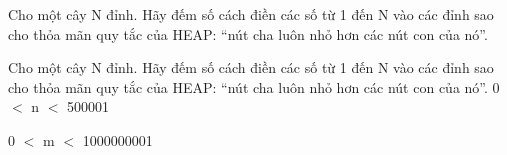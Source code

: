 Cho một cây N đỉnh. Hãy đếm số cách điền các số từ 1 đến N vào các đỉnh sao cho thỏa mãn quy tắc của HEAP: “nút cha luôn nhỏ hơn các nút con của nó”.

Cho một cây N đỉnh. Hãy đếm số cách điền các số từ 1 đến N vào các đỉnh sao cho thỏa mãn quy tắc của HEAP: “nút cha luôn nhỏ hơn các nút con của nó”.
0 $<$ n $<$ 500001

0 $<$ m $<$ 1000000001